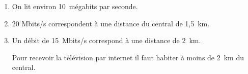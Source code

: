 
\medskip

% 
%

\begin{enumerate}
\item %
On lit environ 10~mégabits par seconde.
\item %
$20$ Mbits/s correspondent à une distance du central de 1,5~km. 
\item %
 
Un débit de 15~Mbits/s correspond à une distance de 2~km.

Pour recevoir la télévision par internet il faut habiter à moins de 2~km du central. 
\end{enumerate}

\bigskip

